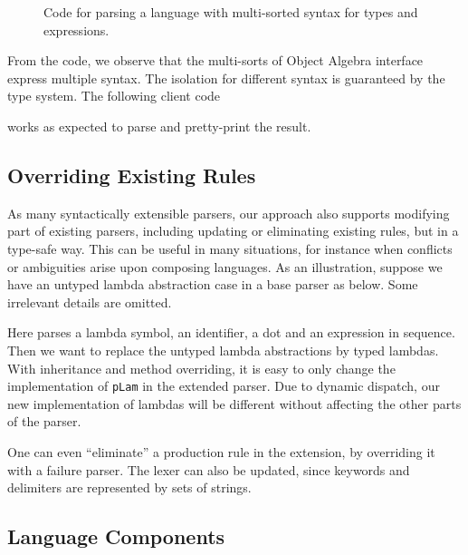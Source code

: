 \begin{figure}[ht]
\caption{Code for parsing a language with multi-sorted syntax for types and expressions.}
\label{fig:multi}
\end{figure}

From the code, we observe that the multi-sorts of Object Algebra interface
express multiple syntax. The isolation for different syntax
is guaranteed by the type system. The following client code

works as expected to parse and pretty-print the result.

\subsection{Overriding Existing Rules}\label{subsec:overriding-rules}

As many syntactically extensible parsers, our approach also supports
modifying part of existing parsers, including updating or eliminating existing rules,
but in a type-safe way. This can be useful in many
situations, for instance when conflicts or ambiguities arise upon composing languages.
As an illustration, suppose we have an untyped lambda abstraction case in a base parser as below. Some irrelevant details are omitted.

Here  parses a lambda symbol, an identifier, a dot and an expression in sequence.
Then we want to replace the untyped lambda abstractions by typed
lambdas. With inheritance and method overriding, it is easy to only
change the implementation of \lstinline{pLam} in the extended parser.
Due to dynamic dispatch, our new
implementation of lambdas will be different without affecting the other parts of the parser.



One can even ``eliminate'' a production rule in the extension, by overriding it with a failure parser. The lexer can also be updated, since keywords and delimiters are represented by sets of strings.


\subsection{Language Components}\label{subsec:language-component}

